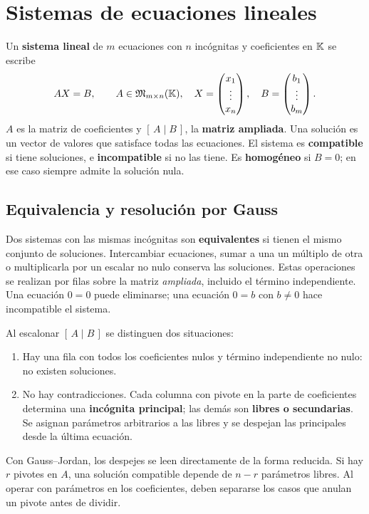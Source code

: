 \chapter{Sistemas de ecuaciones lineales}
\label{cap:sistemas}

Un \textbf{sistema lineal} de $m$ ecuaciones con $n$ incógnitas y
coeficientes en $\mathbb{K}$ se escribe
\[
 AX=B,\qquad A\in\mathfrak{M}_{m\times n}(\mathbb{K}),\quad
 X=\begin{pmatrix}x_1\\\vdots\\x_n\end{pmatrix},\quad
 B=\begin{pmatrix}b_1\\\vdots\\b_m\end{pmatrix}.
\]
$A$ es la matriz de coeficientes y $[\,A\mid B\,]$, la
\textbf{matriz ampliada}. Una solución es un vector de valores que satisface
todas las ecuaciones. El sistema es \textbf{compatible} si tiene soluciones,
e \textbf{incompatible} si no las tiene. Es \textbf{homogéneo} si $B=0$;
en ese caso siempre admite la solución nula.

\section{Equivalencia y resolución por Gauss}
\label{sec:resolucion}

Dos sistemas con las mismas incógnitas son \textbf{equivalentes} si tienen
el mismo conjunto de soluciones. Intercambiar ecuaciones, sumar a una un
múltiplo de otra o multiplicarla por un escalar no nulo conserva las
soluciones. Estas operaciones se realizan por filas sobre la matriz
\emph{ampliada}, incluido el término independiente.
Una ecuación $0=0$ puede eliminarse; una ecuación $0=b$ con $b\ne0$
hace incompatible el sistema.

Al escalonar $[\,A\mid B\,]$ se distinguen dos situaciones:
\begin{enumerate}
 \item Hay una fila con todos los coeficientes nulos y término independiente
       no nulo: no existen soluciones.
 \item No hay contradicciones. Cada columna con pivote en la parte de
       coeficientes determina una \textbf{incógnita principal}; las demás
       son \textbf{libres o secundarias}. Se asignan parámetros arbitrarios
       a las libres y se despejan las principales desde la última ecuación.
\end{enumerate}
Con Gauss--Jordan, los despejes se leen directamente de la forma reducida.
Si hay $r$ pivotes en $A$, una solución compatible depende de $n-r$
parámetros libres. Al operar con parámetros en los coeficientes, deben
separarse los casos que anulan un pivote antes de dividir.

